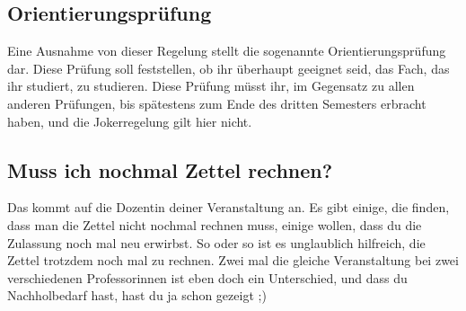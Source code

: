\subsection{Orientierungsprüfung}
Eine Ausnahme von dieser Regelung stellt die sogenannte Orientierungsprüfung dar. Diese Prüfung soll feststellen, ob ihr überhaupt geeignet seid, das Fach, das ihr studiert, zu studieren. Diese Prüfung müsst ihr, im Gegensatz zu allen anderen Prüfungen, bis spätestens zum Ende des dritten Semesters erbracht haben, und die Jokerregelung gilt hier nicht.

\subsection{Muss ich nochmal Zettel rechnen?}
Das kommt auf die Dozentin deiner Veranstaltung an. Es gibt einige, die finden, dass man die Zettel nicht nochmal rechnen muss, einige wollen, dass du die Zulassung noch mal neu erwirbst. So oder so ist es unglaublich hilfreich, die Zettel trotzdem noch mal zu rechnen. Zwei mal die gleiche Veranstaltung bei zwei verschiedenen Professorinnen ist eben doch ein Unterschied, und dass du Nachholbedarf hast, hast du ja schon gezeigt ;)
